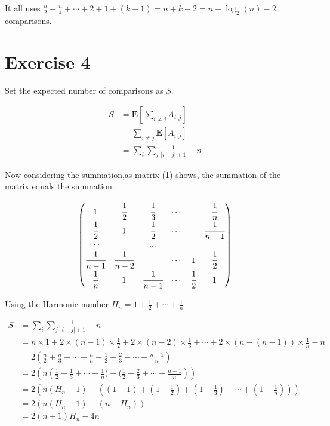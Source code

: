 \documentclass[
]{article}
\newenvironment{Shaded}{\begin{snugshade}}{\end{snugshade}}
\begin{document}
\begin{Shaded}
\begin{Highlighting}[]
\end{Highlighting}
\end{Shaded}

It all uses
\(\frac{n}{2}+\frac{n}{4}+\cdots+2+1+(k-1)=n+k-2=n+\log_2(n)-2\)
comparisons.

\hypertarget{exercise-4}{%
\section{Exercise 4}\label{exercise-4}}

Set the expected number of comparisons as \(S\).

\[\begin{aligned}
S&=\mathbf{E}[\sum_{i\neq j} A_{i,j}]\\
&=\sum_{i\neq j}\mathbf{E}[A_{i,j}]\\
&=\sum_{i}\sum_{j}\frac{1}{|i-j|+1}-n
\end{aligned}\]

Now considering the summation,as matrix (1) shows, the summation of the
matrix equals the summation.

\[\begin{aligned}
\begin{pmatrix}
1&\cfrac{1}{2}&\cfrac{1}{3}&\cdots& &\cfrac{1}{n}\\
\cfrac{1}{2}&1&\cfrac{1}{2}&\cdots&&\cfrac{1}{n-1}\\\cdots
& &...\\
\cfrac{1}{n-1}&\cfrac{1}{n-2}& &\cdots&1&\cfrac{1}{2}\\
\cfrac{1}{n}&1&\cfrac{1}{n-1}&\cdots&\cfrac{1}{2}&1\\
\end{pmatrix}
\end{aligned}\]

Using the Harmonic number \(H_{n}=1+\frac{1}{2}+\cdots+\frac{1}{n}\)

\[\begin{aligned}
S&=\sum_{i}\sum_{j}\frac{1}{|i-j|+1}-n\\
&=n\times 1+2\times(n-1)\times\frac{1}{2}+2\times(n-2)\times\frac{1}{3}+\cdots+2\times(n-(n-1))\times\frac{1}{n}-n\\
&=2\left(\frac{n}{2}+\frac{n}{3}+\cdots+\frac{n}{n}-\frac{1}{2}-\frac{2}{3}-\cdots-\frac{n-1}{n}\right)\\
&=2\left(n\left(\frac{1}{2}+\frac{1}{3}+\cdots+\frac{1}{n})-(\frac{1}{2}+\frac{2}{3}+\cdots+\frac{n-1}{n}\right)\right)\\
&=2\left(n\left(H_{n}-1\right)-\left(\left(1-1\right)+\left(1-\frac{1}{2}\right)+\left(1-\frac{1}{3}\right)+\cdots+\left(1-\frac{1}{n}\right)\right)\right)\\
&=2\left(n\left(H_{n}-1\right)-\left(n-H_{n}\right)\right)\\
&=2\left(n+1\right)H_{n}-4n
\end{aligned}\]
\end{document}
